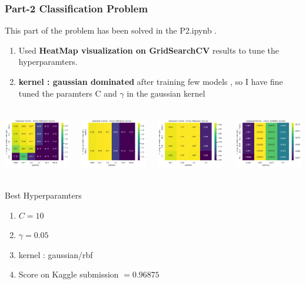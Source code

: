 \documentclass[12pt,t]{beamer}
\begin{document}
\begin{frame}[t]
    \frametitle{Part-2 Classification Problem}
    \scriptsize
    This part of the problem has been solved in  the P2.ipynb .
    \begin{enumerate}
        \item Used \textbf{HeatMap visualization on GridSearchCV} results to tune the hyperparamters.
        \item \textbf{kernel : gaussian dominated} after training few models , so I have fine tuned the 
            paramters C and $\gamma$ in the gaussian kernel
    \end{enumerate}

    \begin{columns}[]
        \begin{column}[]{0.25\linewidth}
            \includegraphics[width=\linewidth,height=70pt]{images/p2/1.png}
        \end{column}
        \begin{column}[]{0.25\linewidth}
            \includegraphics[width=\linewidth,height=70pt]{images/p2/2.png}
        \end{column}
        \begin{column}[]{0.25\linewidth}
            \includegraphics[width=\linewidth,height=70pt]{images/p2/3.png}
        \end{column}
        \begin{column}[]{0.25\linewidth}
            \includegraphics[width=\linewidth,height=70pt]{images/p2/5.png}
        \end{column}
    \end{columns}

    \begin{block}{Best Hyperparamters}
        \begin{enumerate}
            \item $C= 10$
            \item $\gamma =0.05$
            \item kernel : gaussian/rbf
            \item  Score on Kaggle submission $=0.96875$
        \end{enumerate}
    \end{block}
    

\end{frame}
\end{document}
